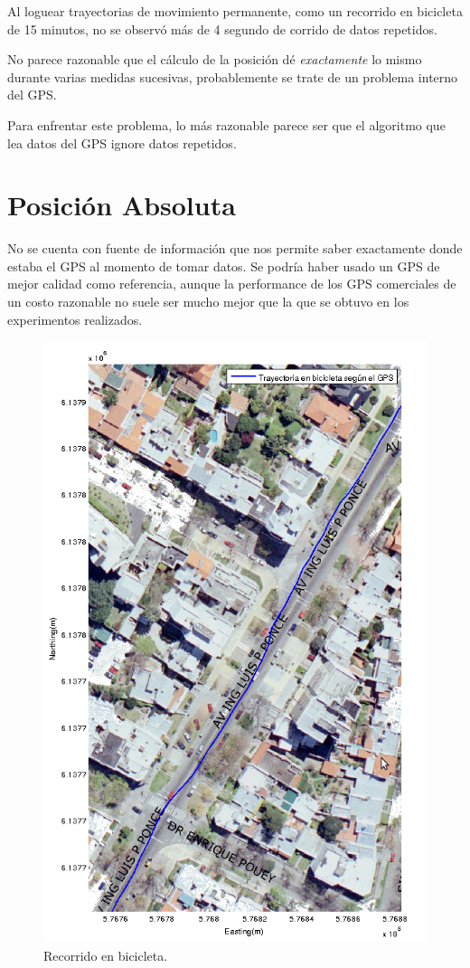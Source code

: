 \documentclass[spanish,12pt,a4paper,titlepage]{report}
\begin{document}
Al loguear trayectorias de movimiento permanente, como un recorrido en bicicleta de 15 minutos, no se observó más de 4 segundo de corrido de datos repetidos.

No parece razonable que el cálculo de la posición dé \textit{exactamente} lo mismo durante varias medidas sucesivas, probablemente se trate de un problema interno del GPS.

Para enfrentar este problema, lo más razonable parece ser que el algoritmo que lea datos del GPS ignore datos repetidos.

\newpage
\section{Posición Absoluta}
\label{sec:posicion-absoluta}

No se cuenta con fuente de información que nos permite saber exactamente donde estaba el GPS al momento de tomar datos. Se podría haber usado un GPS de mejor calidad como referencia, aunque la performance de los GPS comerciales de un costo razonable no suele ser mucho mejor que la que se obtuvo en los experimentos realizados.

\begin{figure}
  \begin{center}
\vspace{-30pt}
  \includegraphics[width=.8\textwidth]{./img/ponce.png}
  \end{center}
  \caption{Recorrido en bicicleta.}
  \label{fig:ponce.png}
\end{figure}
\end{document}
